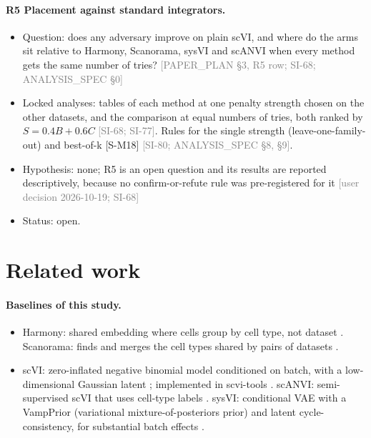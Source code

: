 \documentclass[11pt]{article}
\newcommand{\src}[1]{{\scriptsize\textcolor{gray}{[#1]}}}
\begin{document}
\paragraph{R5 Placement against standard integrators.}
\begin{itemize}
\item Question: does any adversary improve on plain scVI, and where do the arms sit relative to Harmony, Scanorama, sysVI and scANVI when every method gets the same number of tries? \src{PAPER\_PLAN \S3, R5 row; SI-68; ANALYSIS\_SPEC \S0}
\item Locked analyses: tables of each method at one penalty strength chosen on the other datasets, and the comparison at equal numbers of tries, both ranked by $S = 0.4B + 0.6C$ \src{SI-68; SI-77}. Rules for the single strength (leave-one-family-out) and best-of-k [S-M18] \src{SI-80; ANALYSIS\_SPEC \S8, \S9}.
\item Hypothesis: none; R5 is an open question and its results are reported descriptively, because no confirm-or-refute rule was pre-registered for it \src{user decision 2026-10-19; SI-68}
\item Status: open.
\end{itemize}


\section{Related work}\label{sec:related}

\paragraph{Baselines of this study.}
\begin{itemize}
\item Harmony: shared embedding where cells group by cell type, not dataset \citep{korsunsky2019fast}. Scanorama: finds and merges the cell types shared by pairs of datasets \citep{hie2019efficient}.
\item scVI: zero-inflated negative binomial model conditioned on batch, with a low-dimensional Gaussian latent \citep{lopez2018deep}; implemented in scvi-tools \citep{gayoso2022python}. scANVI: semi-supervised scVI that uses cell-type labels \citep{xu2021probabilistic}. sysVI: conditional VAE with a VampPrior (variational mixture-of-posteriors prior) and latent cycle-consistency, for substantial batch effects \citep{hrovatin2025integrating}.
\end{itemize}
\end{document}
